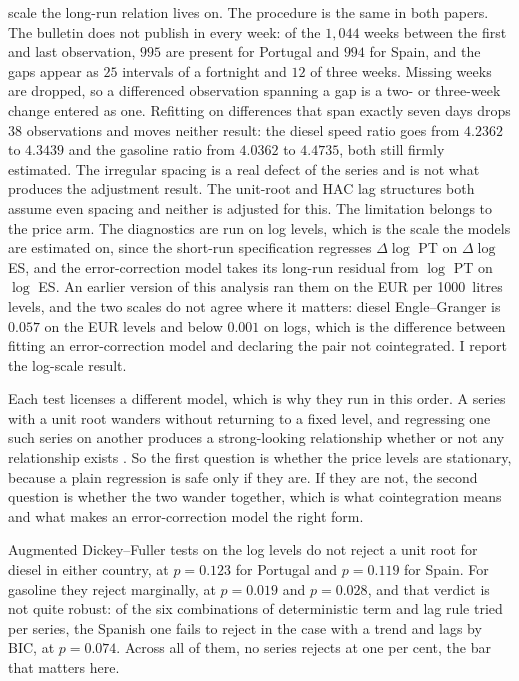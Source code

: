 \documentclass[11pt,a4paper]{article}
\begin{document}
scale the long-run relation lives on. The procedure is the same in both papers. The bulletin
does not publish in every week: of the $1{,}044$ weeks between the first and last observation,
$995$ are present for Portugal and $994$ for Spain, and the gaps appear as $25$ intervals of a
fortnight and $12$ of three weeks. Missing weeks are dropped, so a differenced observation
spanning a gap is a two- or three-week change entered as one. Refitting on differences
that span exactly seven days drops $38$ observations and moves neither result: the diesel
speed ratio goes from $4.2362$ to $4.3439$ and the gasoline ratio from $4.0362$ to $4.4735$,
both still firmly estimated. The irregular spacing is a real defect of the series and is not
what produces the adjustment result. The unit-root and HAC lag
structures both assume even spacing and neither is adjusted for this. The limitation belongs to
the price arm. The diagnostics are run on log levels, which is the scale the models are
estimated on, since the short-run specification regresses $\Delta \log$ PT on $\Delta \log$ ES,
and the error-correction model takes its long-run residual from $\log$ PT on $\log$ ES. An
earlier version of this analysis ran them on the EUR per 1000~litres levels, and the two scales
do not agree where it matters: diesel Engle--Granger is $0.057$ on the EUR levels and below
$0.001$ on logs, which is the difference between fitting an error-correction model and
declaring the pair not cointegrated. I report the log-scale result.

Each test licenses a different model, which is why they run in this order. A series with a unit
root wanders without returning to a fixed level, and regressing one such series on another
produces a strong-looking relationship whether or not any relationship exists
\citep{granger1974spurious}. So the first question is whether the price levels are stationary,
because a plain regression is safe only if they are. If they are not, the second question is
whether the two wander together, which is what cointegration means and what makes an error-correction
model the right form.

Augmented Dickey--Fuller tests \citep{dickey1979distribution, said1984testing} on the log
levels do not reject a unit root for diesel in either
country, at $p=0.123$ for Portugal and $p=0.119$ for Spain. For gasoline they reject marginally,
at $p=0.019$ and $p=0.028$, and that verdict is not quite robust: of the six combinations of
deterministic term and lag rule tried per series, the Spanish one fails to reject in the case
with a trend and lags by BIC, at $p=0.074$. Across all of them, no series rejects at one per
cent, the bar that matters here.
\end{document}
